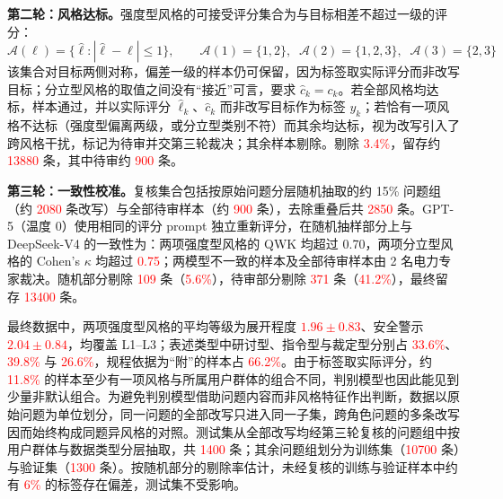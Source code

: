 \documentclass[fontset=fandol,type=master,campus=shenzhen,etitleauto=true]{hithesisbook}
\newcommand{\rev}[1]{\textcolor{red}{#1}}
\begin{document}
\textbf{第二轮：风格达标。}强度型风格的可接受评分集合为与目标相差不超过一级的评分：
\begin{equation}\label{eq:accept-level}
\mathcal{A}(\ell) = \bigl\{ \hat{\ell} : |\hat{\ell} - \ell| \le 1 \bigr\}, \qquad \mathcal{A}(1) = \{1, 2\}, \;\; \mathcal{A}(2) = \{1, 2, 3\}, \;\; \mathcal{A}(3) = \{2, 3\}
\end{equation}
该集合对目标两侧对称，偏差一级的样本仍可保留，因为标签取实际评分而非改写目标；分立型风格的取值之间没有“接近”可言，要求 $\hat{c}_k = c_k$。若全部风格均达标，样本通过，并以实际评分 $\hat{\ell}_k$、$\hat{c}_k$ 而非改写目标作为标签 $y_k$；若恰有一项风格不达标（强度型偏离两级，或分立型类别不符）而其余均达标，视为改写引入了跨风格干扰，标记为待审并交第三轮裁决；其余样本剔除。剔除 \rev{3.4\%}，留存约 \rev{13880} 条，其中待审约 \rev{900} 条。

\textbf{第三轮：一致性校准。}复核集合包括按原始问题分层随机抽取的约 15\% 问题组（约 \rev{2080} 条改写）与全部待审样本（约 \rev{900} 条），去除重叠后共 \rev{2850} 条。GPT-5（温度 0）使用相同的评分 prompt 独立重新评分，在随机抽样部分上与 DeepSeek-V4 的一致性为：两项强度型风格的 QWK 均超过 0.70，两项分立型风格的 Cohen's $\kappa$ 均超过 \rev{0.75}；两模型不一致的样本及全部待审样本由 2 名电力专家裁决。随机部分剔除 \rev{109} 条（\rev{5.6\%}），待审部分剔除 \rev{371} 条（\rev{41.2\%}），最终留存 \rev{13400} 条。

最终数据中，两项强度型风格的平均等级为展开程度 \rev{$1.96 \pm 0.83$}、安全警示 \rev{$2.04 \pm 0.84$}，均覆盖 L1--L3；表述类型中研讨型、指令型与裁定型分别占 \rev{33.6\%}、\rev{39.8\%} 与 \rev{26.6\%}，规程依据为“附”的样本占 \rev{66.2\%}。由于标签取实际评分，约 \rev{11.8\%} 的样本至少有一项风格与所属用户群体的组合不同，判别模型也因此能见到少量非默认组合。为避免判别模型借助问题内容而非风格特征作出判断，数据以原始问题为单位划分，同一问题的全部改写只进入同一子集，跨角色问题的多条改写因而始终构成同题异风格的对照。测试集从全部改写均经第三轮复核的问题组中按用户群体与数据类型分层抽取，共 \rev{1400} 条；其余问题组划分为训练集（\rev{10700} 条）与验证集（\rev{1300} 条）。按随机部分的剔除率估计，未经复核的训练与验证样本中约有 \rev{6\%} 的标签存在偏差，测试集不受影响。
\end{document}
